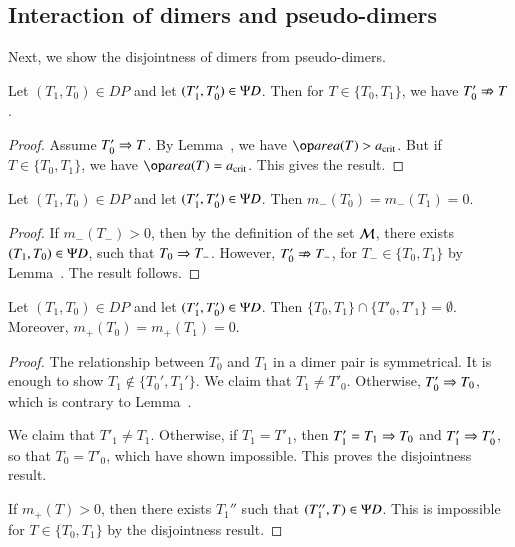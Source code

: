\subsection{Interaction of dimers and pseudo-dimers}

Next, we show the disjointness of dimers from pseudo-dimers.

\begin{lemma}
  Let $(T_1,T_0)\in DP$ and let $(T'_1,T'_0)\in\Psi D$.  Then for
  $T\in\{T_0,T_1\}$, we have $T'_0\nRightarrow T$.
\end{lemma}

\begin{proof} 
  Assume $T'_0\Rightarrow T$.  By Lemma~, we have
  $\area(T)>\acrit$.  But if $T\in\{T_0,T_1\}$, we have
  $\area(T)=\acrit$.  This gives the result.
\end{proof}

\begin{corollary}  
  Let $(T_1,T_0)\in DP$ and let $(T'_1,T'_0)\in \Psi D$.  Then
  $m_-(T_0)=m_-(T_1)=0$.
\end{corollary}

\begin{proof}  
  If $m_-(T_-)>0$, then by the definition of the set $\mathcal M$, there
  exists $(T_1,T_0)\in \Psi D$, such that $T_0\Rightarrow T_-$.  However,
  $T'_0\nRightarrow T_-$, for $T_-\in\{T_0,T_1\}$ by
  Lemma~.  The result follows.
\end{proof}

\begin{lemma}  
  Let $(T_1,T_0)\in DP$ and let $(T'_1,T'_0)\in\Psi D$.  Then
  $\{T_0,T_1\}\cap \{T'_0,T'_1\} = \emptyset$.  Moreover,
  $m_+(T_0) = m_+(T_1)=0$.
\end{lemma}

\begin{proof}
  The relationship between $T_0$ and $T_1$ in a dimer pair is
  symmetrical.  It is enough to show $T_1\not\in\{T_0',T_1'\}$.  We
  claim that $T_1\ne T'_0$.  Otherwise, $T'_0\Rightarrow T_0$, which is
  contrary to Lemma~.

  We claim that $T'_1\ne T_1$.  Otherwise, if $T_1=T'_1$, then
  $T'_1=T_1\Rightarrow T_0$ and $T'_1\Rightarrow T'_0$, so that $T_0 = T'_0$, which
  have shown impossible.  This proves the disjointness result.

  If $m_+(T) >0$, then there exists $T_1''$ such that $(T_1'',T)\in
  \Psi D$.  This is impossible for $T\in\{T_0,T_1\}$ by the disjointness
  result.
\end{proof}


